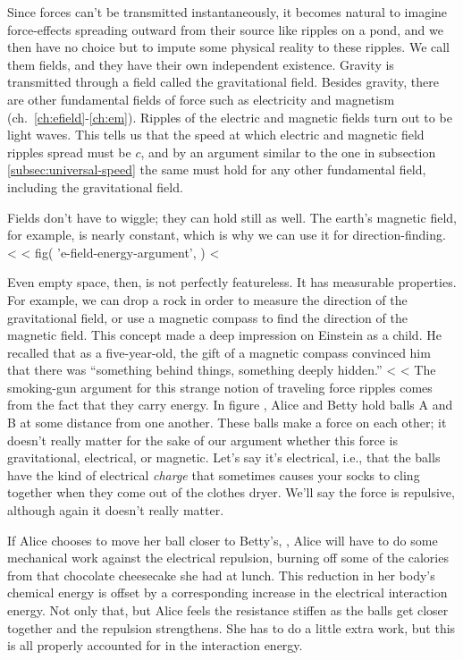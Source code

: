 Since forces can't be transmitted instantaneously, it becomes natural to imagine force-effects
spreading outward from their source like ripples on a pond, and we then have no choice but to
impute some physical reality to these ripples. We call them fields, and they have their own
independent existence. Gravity is transmitted through a field called the gravitational field.
Besides gravity, there are other fundamental fields of force such as electricity and magnetism
(ch.~\ref{ch:efield}-\ref{ch:em}). Ripples of the electric and magnetic fields
turn out to be light waves. This tells us that the speed at which electric and magnetic field
ripples spread must be $c$, and by an argument similar to the one in subsection
\ref{subsec:universal-speed} the same must hold for any other fundamental field, including
the gravitational field.

Fields don't have to wiggle; they can hold still as well. The earth's magnetic
field, for example, is nearly constant, which is why we can use it for direction-finding.
<%
<%
  fig(
    'e-field-energy-argument',
  )
<%

Even empty space, then, is not perfectly featureless. It has measurable
properties. For example, we can drop a rock in order to measure the direction of the gravitational
field, or use a magnetic compass to find the direction of the magnetic field. This concept made a deep impression
on Einstein as a child. He recalled that
as a five-year-old, the gift of a magnetic compass convinced him that there was ``something behind things, something deeply hidden.''
<%
<%
The smoking-gun argument for this strange notion of
traveling force ripples comes from the fact that they carry energy. In figure ,
Alice and Betty hold balls A and B at some distance from one another.
These balls make a force on each other; it doesn't really matter for the sake of our argument
whether this force is gravitational, electrical, or magnetic. Let's say it's electrical, i.e., that the balls
have the kind of electrical \emph{charge} that sometimes causes your socks to cling together when they come out
of the clothes dryer. We'll say the force is repulsive, although again it doesn't really matter.

If Alice chooses to move
her ball closer to Betty's, , Alice will have to do some mechanical work
against the electrical repulsion, burning off some of the calories from that
chocolate cheesecake she had at lunch.
This reduction in
her body's chemical energy is offset by a corresponding increase in the electrical interaction energy.
Not only that, but Alice feels the resistance stiffen as the balls get closer together
and the repulsion strengthens. 
She has to do a little extra work, but this is all properly accounted for in the interaction energy.

